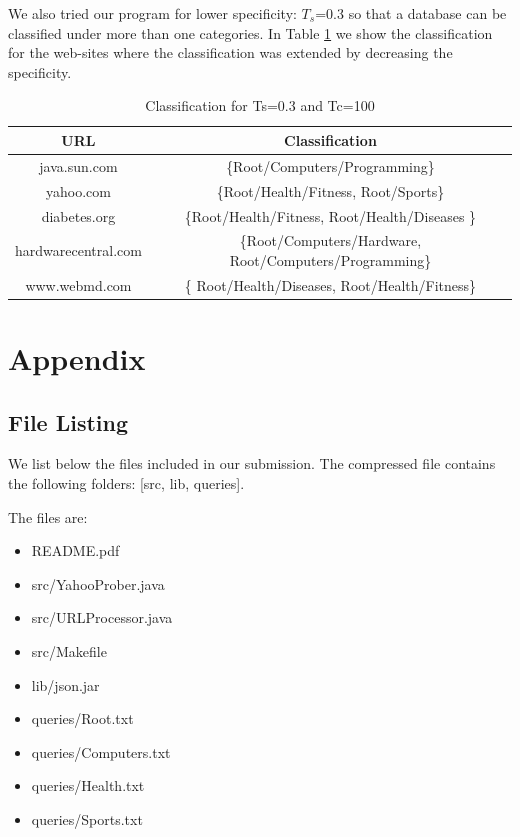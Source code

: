 \documentclass[11pt]{article}
\begin{document}
We also tried our program for lower  specificity: $T_s$=0.3 so that a database can be classified under more than one categories. In Table \ref{Res2} we show the classification for the web-sites where the classification was extended by decreasing the specificity.
\begin{table}[!h]
\begin{tabular}{|c|c|}
\hline
\textbf{URL} & \textbf{Classification}\\
\hline
java.sun.com & \{Root/Computers/Programming\} \\
\hline
yahoo.com& \{Root/Health/Fitness, Root/Sports\}\\
\hline
diabetes.org& \{Root/Health/Fitness,
Root/Health/Diseases \}\\
\hline
hardwarecentral.com& \{Root/Computers/Hardware, Root/Computers/Programming\}\\
\hline
www.webmd.com & \{ Root/Health/Diseases, Root/Health/Fitness\} \\
\hline
\end{tabular}
\caption{Classification for Ts=0.3 and Tc=100}
\label{Res2}
\end{table}

\section* {Appendix}

\subsection* {File Listing}

We list below the files included in our submission. The compressed file contains the following folders: [src, lib, queries].

The files are:
\begin{itemize}
\item README.pdf
\item src/YahooProber.java
\item src/URLProcessor.java
\item src/Makefile
\item lib/json.jar
\item queries/Root.txt
\item queries/Computers.txt
\item queries/Health.txt
\item queries/Sports.txt
\end{itemize}
\end{document}
